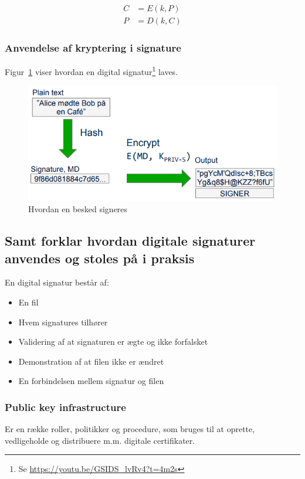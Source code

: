 \begin{align}
	C &= E(k,P)\\
	P &= D(k,C)
\end{align}



\subsubsection{Anvendelse af kryptering i signature}
Figur~\ref{fig:digital-signature} viser hvordan en digital signatur\footnote{Se \url{https://youtu.be/GSIDS_lvRv4?t=4m2s}} laves.

\begin{figure}[H]
	\centering
	\includegraphics[width=0.7\linewidth]{figs/spm5/digital-signature}
	\caption{Hvordan en besked signeres}
	\label{fig:digital-signature}
\end{figure}

\subsection{Samt forklar hvordan digitale signaturer anvendes og stoles på i praksis}
En digital signatur består af:

\begin{itemize}
	\item En fil
	\item Hvem signatures tilhører
	\item Validering af at signaturen er ægte og ikke forfalsket
	\item Demonstration af at filen ikke er ændret
	\item En forbindelsen mellem signatur og filen
\end{itemize}

\subsubsection{Public key infrastructure}
Er en række roller, politikker og procedure, som bruges til at oprette, vedligeholde og distribuere m.m. digitale certifikater.

